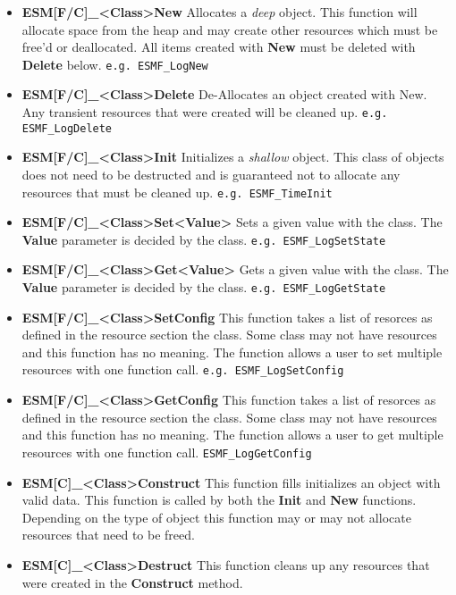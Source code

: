 \begin{itemize}
\item{\bf ESM[F/C]\_<Class>New}
Allocates a {\it deep} object.  This function will allocate space from the heap and may
create other resources which must be free'd or deallocated.  All items created with
{\bf New} must be deleted with {\bf Delete} below.  {\tt e.g. ESMF\_LogNew}

\item{\bf ESM[F/C]\_<Class>Delete}
De-Allocates an object created with New.  Any transient resources that were created will
be cleaned up. {\tt e.g. ESMF\_LogDelete}

\item{\bf ESM[F/C]\_<Class>Init}
Initializes a {\it shallow} object.  This class of objects does not need to be destructed and
is guaranteed not to allocate any resources that must be cleaned up.  {\tt e.g. ESMF\_TimeInit}

\item{\bf ESM[F/C]\_<Class>Set<Value>}
Sets a given value with the class.  The {\bf Value} parameter is decided by the class. 
{\tt e.g. ESMF\_LogSetState}

\item{\bf ESM[F/C]\_<Class>Get<Value>}
Gets a given value with the class.  The {\bf Value} parameter is decided by the class.  
{\tt e.g. ESMF\_LogGetState}

\item{\bf ESM[F/C]\_<Class>SetConfig}
This function takes a list of resorces as defined in the resource section the class.  Some class
may not have resources and this function has no meaning.  The function allows a user to set multiple
resources with one function call.  {\tt e.g. ESMF\_LogSetConfig}

\item{\bf ESM[F/C]\_<Class>GetConfig}
This function takes a list of resorces as defined in the resource section the class.  Some class
may not have resources and this function has no meaning.  The function allows a user to get multiple
resources with one function call.  {\tt ESMF\_LogGetConfig}

\item{\bf ESM[C]\_<Class>Construct}
This function fills initializes an object with valid data.  This function is called by both the
{\bf Init} and {\bf New} functions.  Depending on the type of object this function may or may not 
allocate resources that need to be freed.

\item{\bf ESM[C]\_<Class>Destruct}
This function cleans up any resources that were created in the {\bf Construct} method.

\end{itemize}


